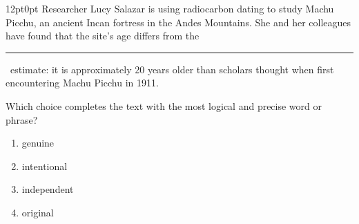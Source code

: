 \documentclass[11pt, twocolumn]{article}
\newcounter{questionnum}
\begin{document}
\vspace{6pt}\noindent
\begin{minipage}{\columnwidth}\raggedright
\noindent{}\par\vspace{8pt}
\begin{adjustwidth}{12pt}{0pt}
Researcher Lucy Salazar is using radiocarbon dating to study Machu Picchu, an ancient Incan fortress in the Andes Mountains. She and her colleagues have found that the site's age differs from the \,\rule{2cm}{0.4pt}\, estimate: it is approximately 20 years older than scholars thought when first encountering Machu Picchu in 1911.
\vspace{6pt}

Which choice completes the text with the most logical and precise word or phrase?
\begin{enumerate}[label=\Alph*),leftmargin=18pt,topsep=3pt,itemsep=2pt]
  \item genuine
  \item intentional
  \item independent
  \item original
\end{enumerate}
\end{adjustwidth}
\end{minipage}\par
\end{document}
